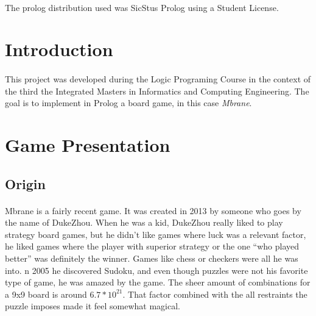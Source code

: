 \documentclass[a4paper]{article}
\begin{document}
\paragraph{}
The prolog distribution used was SicStus Prolog using a Student License.

\newpage

\tableofcontents



\newpage

\section{Introduction}
\paragraph{}
This project was developed during the Logic Programing Course in the context of the third the Integrated Masters in Informatics 
and Computing Engineering. The goal is to implement in Prolog a board game, in this case \textit{Mbrane}.

\pagebreak
\section{Game Presentation}

\subsection{Origin}

\paragraph{}
Mbrane is a fairly recent game. It was created in 2013 by someone who goes by the name of DukeZhou. 
When he was a kid, DukeZhou really liked to play strategy board games, but he didn’t like games where luck was a 
relevant factor, he liked games where the player with superior strategy or the one “who played better” was definitely the winner. 
Games like chess or checkers were all he was into. n 2005 he discovered Sudoku, and even though puzzles were not his favorite type 
of game, he was amazed by the game. The sheer amount of combinations for a 9x9 board is around $6.7*10^21$. That factor combined with 
the all restraints the puzzle imposes made it feel somewhat magical.
\end{document}

